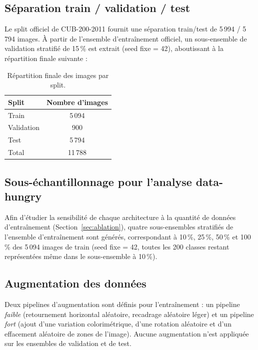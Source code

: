 \subsection{Séparation train / validation / test}

Le split officiel de CUB-200-2011 fournit une séparation
train/test de 5\,994 / 5\,794 images. À partir de l'ensemble
d'entraînement officiel, un sous-ensemble de validation stratifié de
15\,\% est extrait (seed fixe = 42), aboutissant à la répartition finale
suivante :

\begin{table}[t]
  \centering
  \caption{Répartition finale des images par split.}
  \label{tab:splits}
  \begin{tabular}{lc}
    \toprule
    Split & Nombre d'images \\
    \midrule
    Train & 5\,094 \\
    Validation & 900 \\
    Test & 5\,794 \\
    \midrule
    Total & 11\,788 \\
    \bottomrule
  \end{tabular}
\end{table}

\subsection{Sous-échantillonnage pour l'analyse data-hungry}

Afin d'étudier la sensibilité de chaque architecture à la quantité de
données d'entraînement (Section~\ref{sec:ablation}), quatre
sous-ensembles stratifiés de l'ensemble d'entraînement sont générés,
correspondant à 10\,\%, 25\,\%, 50\,\% et 100\,\% des 5\,094 images de
train (seed fixe = 42, toutes les 200 classes restant représentées même
dans le sous-ensemble à 10\,\%).

\subsection{Augmentation des données}

Deux pipelines d'augmentation sont définis pour l'entraînement : un
pipeline \emph{faible} (retournement horizontal aléatoire, recadrage
aléatoire léger) et un pipeline \emph{fort} (ajout d'une variation
colorimétrique, d'une rotation aléatoire et d'un effacement aléatoire de
zones de l'image). Aucune augmentation n'est appliquée sur les ensembles
de validation et de test.
